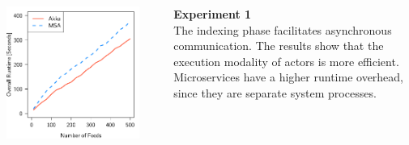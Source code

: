 \documentclass[final,hyperref={pdfpagelabels=true}]{beamer}
\begin{document}
\begin{frame}
\begin{columns}[t]
\begin{column}{.43\textwidth}
      \renewcommand\sfdefault{lmss} %
      
      \begin{columns}[t]
        \begin{column}{.46\textwidth}
          \begin{center}
          \includegraphics[width=1\textwidth]{graphics/eval-index-overall.pdf}
          \end{center}
        \end{column}
        \begin{column}{.08\textwidth}
        \end{column}
        \begin{column}{.46\textwidth}
          {\lmodern
            \begin{justify}
              \textsf{\textbf{Experiment 1}} \\
              \vspace*{.5\baselineskip}
              The indexing phase facilitates asynchronous communication. The results show that the execution modality of actors is more efficient. Microservices have a higher runtime overhead, since they are separate system processes. 
            \end{justify}
          }
        \end{column}
      \end{columns}


\end{column}
\end{columns}
\end{frame}
\end{document}
